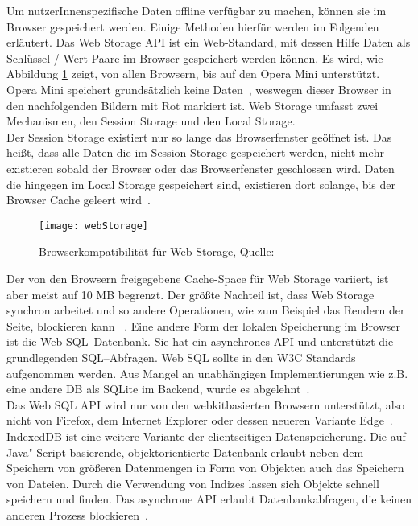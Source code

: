 Um nutzerInnenspezifische Daten offline verfügbar zu machen, können sie im Browser gespeichert werden. Einige Methoden hierfür werden im Folgenden erläutert.
%
Das Web Storage \gls{API} ist ein Web-Standard, mit dessen Hilfe Daten als Schlüssel / Wert Paare im Browser gespeichert werden können. Es wird, wie Abbildung \ref{fig:webStorage} zeigt, von allen Browsern, bis auf den Opera Mini unterstützt. Opera Mini speichert grundsätzlich keine Daten~\cite{opera}, weswegen dieser Browser in den nachfolgenden Bildern mit Rot markiert ist.
Web Storage umfasst zwei Mechanismen, den Session Storage und den Local Storage.\\
Der Session Storage existiert nur so lange das Browserfenster geöffnet ist.
Das heißt, dass alle Daten die im Session Storage gespeichert werden, nicht mehr existieren sobald der Browser oder das Browserfenster geschlossen wird.
Daten die hingegen im Local Storage gespeichert sind, existieren dort solange, bis der Browser Cache geleert wird~\cite{webstorage}.
\begin{figure}[H]
	\centering
	\texttt{[image: webStorage]}
	\grayRule
	\caption[Browserkompatibilität für Web Storage]{Browserkompatibilität für Web Storage, Quelle: ~\cite{caniuse-ws}}
	\label{fig:webStorage}
\end{figure}
Der von den Browsern freigegebene Cache-Space für Web Storage variiert, ist aber meist auf 10 MB begrenzt.
Der größte Nachteil ist, dass Web Storage synchron arbeitet und so andere Operationen, wie zum Beispiel das Rendern der Seite, blockieren kann ~\cite{webstorage-con}.
%
%
Eine andere Form der lokalen Speicherung im Browser ist die Web SQL--Datenbank.
Sie hat ein asynchrones \gls{API} und unterstützt die grundlegenden SQL--Abfragen. Web SQL sollte in den W3C Standards aufgenommen werden. Aus Mangel an unabhängigen Implementierungen wie z.B. eine andere \gls{DB} als SQLite im Backend, wurde es abgelehnt~\cite{websql}.\\
Das Web SQL \gls{API} wird nur von den webkitbasierten Browsern unterstützt, also nicht von Firefox, dem Internet Explorer oder dessen neueren Variante Edge~\cite{caniuse-websql}.
%
%
IndexedDB ist eine weitere Variante der clientseitigen Datenspeicherung. Die auf Java"-Script basierende, objektorientierte Datenbank erlaubt neben dem Speichern von größeren Datenmengen in Form von Objekten auch das Speichern von Dateien. Durch die Verwendung von Indizes lassen sich Objekte schnell speichern und finden. Das asynchrone \gls{API} erlaubt Datenbankabfragen, die keinen anderen Prozess blockieren~\cite{idb}.
